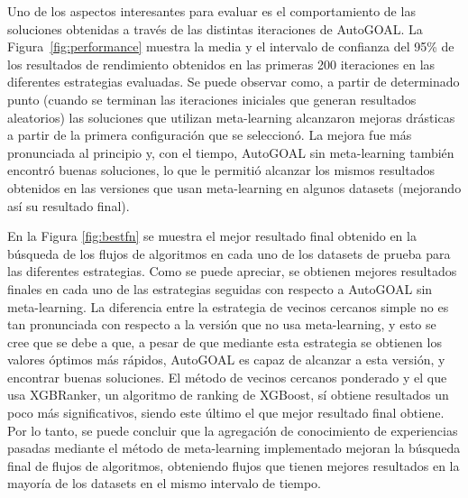 \documentclass[a4paper,12pt]{article}
\begin{document}

Uno de los aspectos interesantes para evaluar es el comportamiento de las soluciones obtenidas a través de las distintas iteraciones de AutoGOAL. La Figura~\ref{fig:performance} muestra la media y el intervalo de confianza del 95\% de los resultados de rendimiento obtenidos en las primeras 200 iteraciones en las diferentes estrategias evaluadas. Se puede observar como, a partir de determinado punto (cuando se terminan las iteraciones iniciales que generan resultados aleatorios) las soluciones que utilizan meta-learning alcanzaron mejoras drásticas a partir de la primera configuración que se seleccionó. La mejora fue más pronunciada al principio y, con el tiempo, AutoGOAL sin meta-learning también encontró buenas soluciones, lo que le permitió alcanzar los mismos resultados obtenidos en las versiones que usan meta-learning en algunos datasets (mejorando así su resultado final). 


En la Figura \ref{fig:bestfn} se muestra el mejor resultado final obtenido en la búsqueda de los flujos de algoritmos en cada uno de los datasets de prueba para las diferentes estrategias. Como se puede apreciar, se obtienen mejores resultados finales en cada uno de las estrategias seguidas con respecto a AutoGOAL sin meta-learning. La diferencia entre la estrategia de vecinos cercanos simple no es tan pronunciada con respecto a  la versión que no usa meta-learning, y esto se cree que se debe a que, a pesar de que mediante esta estrategia se obtienen los valores óptimos más rápidos, AutoGOAL es capaz de alcanzar a esta versión, y encontrar buenas soluciones. El método de vecinos cercanos ponderado y el que usa XGBRanker, un algoritmo de ranking de XGBoost, sí obtiene resultados un poco más significativos, siendo este último el que mejor resultado final obtiene. Por lo tanto, se puede concluir que la agregación de conocimiento de experiencias pasadas mediante el método de meta-learning implementado mejoran la búsqueda final de flujos de algoritmos, obteniendo flujos que tienen mejores resultados en la mayoría de los datasets en el mismo intervalo de tiempo.
\end{document}
